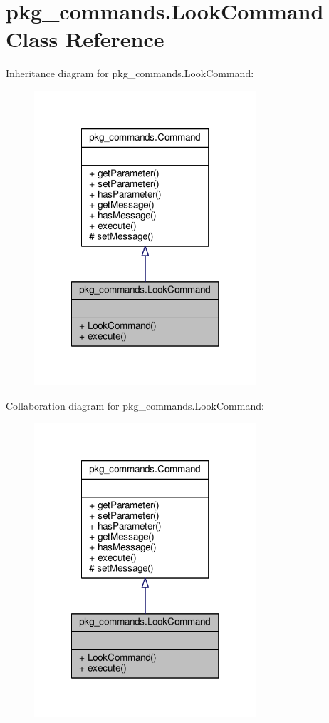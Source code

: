 \hypertarget{classpkg__commands_1_1LookCommand}{\section{pkg\-\_\-commands.\-Look\-Command Class Reference}
\label{classpkg__commands_1_1LookCommand}
}


Inheritance diagram for pkg\-\_\-commands.\-Look\-Command\-:
\nopagebreak
\begin{figure}[H]
\begin{center}
\leavevmode
\includegraphics[width=234pt]{classpkg__commands_1_1LookCommand__inherit__graph}
\end{center}
\end{figure}


Collaboration diagram for pkg\-\_\-commands.\-Look\-Command\-:
\nopagebreak
\begin{figure}[H]
\begin{center}
\leavevmode
\includegraphics[width=234pt]{classpkg__commands_1_1LookCommand__coll__graph}
\end{center}
\end{figure}
